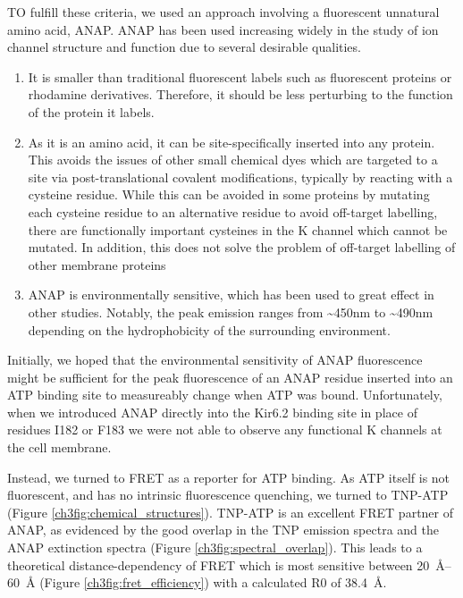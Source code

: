 TO fulfill these criteria, we used an approach involving a fluorescent unnatural amino acid, ANAP.
ANAP has been used increasing widely in the study of ion channel structure and function due to several desirable qualities.

\begin{enumerate}
	\item It is smaller than traditional fluorescent labels such as fluorescent proteins or rhodamine derivatives.
	Therefore, it should be less perturbing to the function of the protein it labels.
	\item As it is an amino acid, it can be site-specifically inserted into any protein.
	This avoids the issues of other small chemical dyes which are targeted to a site via post-translational covalent modifications, typically by reacting with a cysteine residue.
	While this can be avoided in some proteins by mutating each cysteine residue to an alternative residue to avoid off-target labelling, there are functionally important cysteines in the K\ATP{} channel which cannot be mutated.
	In addition, this does not solve the problem of off-target labelling of other membrane proteins
	\item ANAP is environmentally sensitive, which has been used to great effect in other studies.
	Notably, the peak emission ranges from \textasciitilde450nm to \textasciitilde490nm depending on the hydrophobicity of the surrounding environment.
\end{enumerate}

Initially, we hoped that the environmental sensitivity of ANAP fluorescence might be sufficient for the peak fluorescence of an ANAP residue inserted into an ATP binding site to measureably change when ATP was bound.
Unfortunately, when we introduced ANAP directly into the Kir6.2 binding site in place of residues I182 or F183 we were not able to observe any functional K\ATP{} channels at the cell membrane.

Instead, we turned to FRET as a reporter for ATP binding.
As ATP itself is not fluorescent, and has no intrinsic fluorescence quenching, we turned to TNP-ATP (Figure \ref{ch3fig:chemical_structures}).
TNP-ATP is an excellent FRET partner of ANAP, as evidenced by the good overlap in the TNP emission spectra and the ANAP extinction spectra (Figure \ref{ch3fig:spectral_overlap}).
This leads to a theoretical distance-dependency of FRET which is most sensitive between \SIrange{20}{60}{\angstrom} (Figure \ref{ch3fig:fret_efficiency}) with a calculated R0 of \SI{38.4}{\angstrom}.

